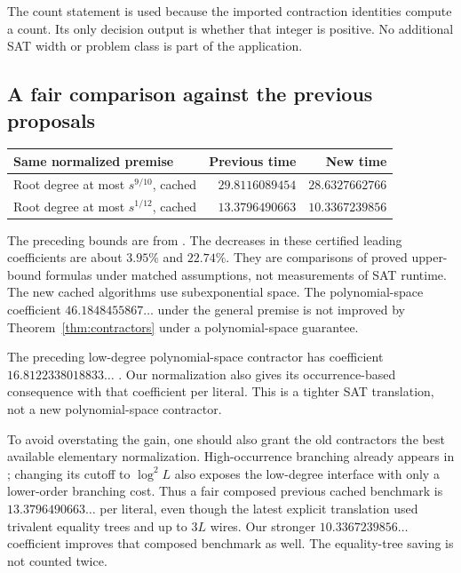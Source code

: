 The count statement is used because the imported contraction identities
compute a count. Its only decision output is whether that integer is
positive. No additional SAT width or problem class is part of the application.

\subsection{A fair comparison against the previous proposals}

\begin{center}\small
\begin{tabular}{@{}p{}rr@{}}
\toprule Same normalized premise & Previous time & New time\\\midrule
Root degree at most $s^{9/10}$, cached & $29.8116089454$ & $28.6327662766$\\
Root degree at most $s^{1/12}$, cached & $13.3796490663$ & $10.3367239856$\\
\bottomrule
\end{tabular}
\end{center}

The preceding bounds are from \cite{pairwise,flags}.
The decreases in these certified leading coefficients are about $3.95\%$
and $22.74\%$. They are comparisons of proved upper-bound formulas under
matched assumptions, not measurements of SAT runtime. The new cached
algorithms use subexponential space. The polynomial-space coefficient
$46.1848455867\ldots$ under the general premise is not improved by
Theorem~\ref{thm:contractors} under a polynomial-space guarantee.

The preceding low-degree polynomial-space contractor has coefficient
$16.8122338018833\ldots$ \cite{pairwise}. Our normalization also gives its
occurrence-based consequence with that coefficient per literal. This is a
tighter SAT translation, not a new polynomial-space contractor.

To avoid overstating the gain, one should also grant the old contractors
the best available elementary normalization. High-occurrence branching
already appears in \cite{balanced}; changing its cutoff to $\log^2 L$
also exposes the low-degree interface with only a lower-order branching
cost. Thus a fair composed previous cached benchmark is
$13.3796490663\ldots$ per literal, even though the latest explicit
translation used trivalent equality trees and up to $3L$ wires.
Our stronger $10.3367239856\ldots$ coefficient improves that composed
benchmark as well. The equality-tree saving is not counted twice.

